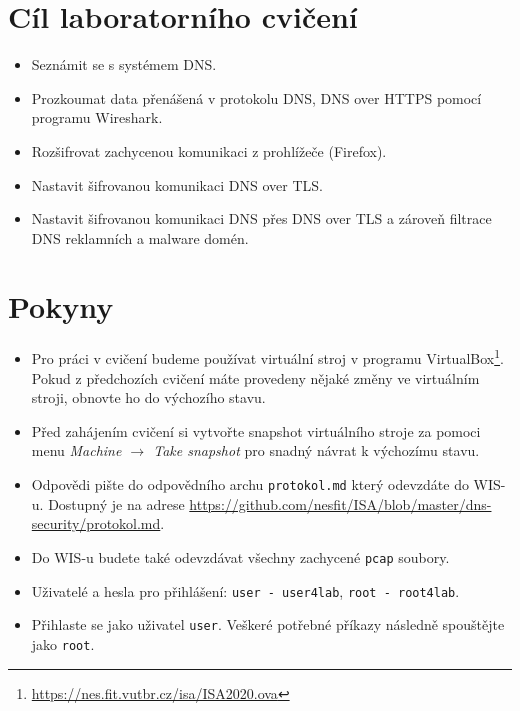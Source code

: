 \section*{Cíl laboratorního cvičení}
\begin{itemize}
  \item Seznámit se s systémem DNS.
  \item Prozkoumat data přenášená v protokolu DNS, DNS over HTTPS pomocí programu Wireshark.
  \item Rozšifrovat zachycenou komunikaci z prohlížeče (Firefox).
  \item Nastavit šifrovanou komunikaci DNS over TLS.
  \item Nastavit šifrovanou komunikaci DNS přes DNS over TLS a zároveň filtrace DNS reklamních a malware domén.
\end{itemize}

\section*{Pokyny}
\begin{itemize}
  \item Pro práci v cvičení budeme používat virtuální stroj v programu
  VirtualBox\footnote{\url{https://nes.fit.vutbr.cz/isa/ISA2020.ova}}. Pokud z předchozích cvičení máte provedeny nějaké změny ve virtuálním stroji, obnovte ho do výchozího stavu.
  \item Před zahájením cvičení si vytvořte snapshot virtuálního stroje za pomoci menu \textit{Machine $\rightarrow$ Take snapshot} pro snadný návrat k výchozímu stavu.
  \item Odpovědi pište do odpovědního archu \texttt{protokol.md} který odevzdáte do WIS-u. Dostupný je na adrese \url{https://github.com/nesfit/ISA/blob/master/dns-security/protokol.md}.
  \item Do WIS-u budete také odevzdávat všechny zachycené \texttt{pcap} soubory.
  \item Uživatelé a hesla pro přihlášení: \texttt{user - user4lab}, \texttt{root - root4lab}.
  \item Přihlaste se jako uživatel \texttt{user}. Veškeré potřebné příkazy následně spouštějte jako \texttt{root}.
\end{itemize}

